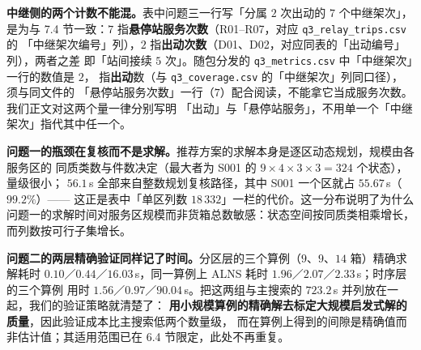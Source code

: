 \textbf{中继侧的两个计数不能混。}表中问题三一行写「分属 $2$ 次出动的 $7$ 个中继架次」，是为与
7.4 节一致：$7$ 指\textbf{悬停站服务次数}（R01--R07，对应 \texttt{q3\_relay\_trips.csv} 的
「中继架次编号」列），$2$ 指\textbf{出动次数}（D01、D02，对应同表的「出动编号」列），两者之差
即「站间接续 $5$ 次」。随包分发的 \texttt{q3\_metrics.csv} 中「中继架次」一行的数值是 $2$，
指\textbf{出动}数（与 \texttt{q3\_coverage.csv} 的「中继架次」列同口径），须与同文件的
「悬停站服务次数」一行（$7$）配合阅读，不能拿它当成服务次数。我们正文对这两个量一律分别写明
「出动」与「悬停站服务」，不用单一个「中继架次」指代其中任一个。

\textbf{问题一的瓶颈在复核而不是求解。}推荐方案的求解本身是逐区动态规划，规模由各服务区的
同质类数与件数决定（最大者为 S001 的 $9\times4\times3\times3=324$ 个状态），量级很小；
$56.1$\,s 全部来自整数规划复核路径，其中 S001 一个区就占 $55.67$\,s（$99.2\%$）——
这正是表中「单区列数 $18\,332$」一栏的代价。这一分布说明了为什么
问题一的求解时间对服务区规模而非货箱总数敏感：状态空间按同质类相乘增长，而列数按可行子集增长。

\textbf{问题二的两层精确验证同样记了时间。}分区层的三个算例（$9$、$9$、$14$ 箱）精确求解耗时
$0.10$／$0.44$／$16.03$\,s，同一算例上 ALNS 耗时 $1.96$／$2.07$／$2.33$\,s；时序层的三个算例
用时 $1.56$／$0.97$／$90.04$\,s。把这两组与主搜索的 $723.2$\,s 并列放在一起，我们的验证策略就清楚了：
\textbf{用小规模算例的精确解去标定大规模启发式解的质量}，因此验证成本比主搜索低两个数量级，
而在算例上得到的间隙是精确值而非估计值；其适用范围已在 6.4 节限定，此处不再重复。
